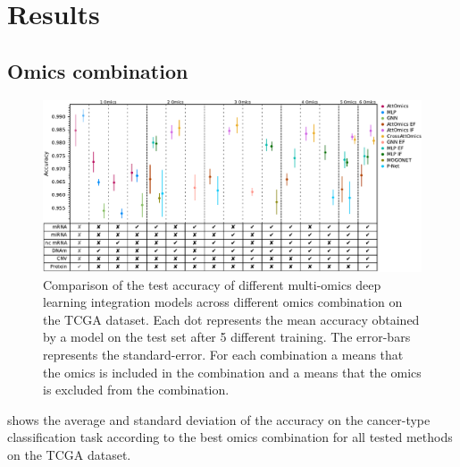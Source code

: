 \documentclass[../main.tex]{subfiles}
\begin{document}
\section{Results}

	\subsection{Omics combination}
		\begin{figure}[htbp]
			\centering
			\includegraphics[width=1\textwidth]{tcga_perf_omics_comb.pdf}
			\caption[Comparison of the test accuracy of different multi-omics deep learning integration models on TCGA data]{Comparison of the test accuracy of different multi-omics deep learning integration models across different omics combination on the TCGA dataset. Each dot represents the mean accuracy obtained by a model on the test set after 5 different training. The error-bars represents the standard-error. For each combination a \cmark means that the omics is included in the combination and a \xmark means that the omics is excluded from the combination.}
			\label{fig:tcga_perf_comb}
		\end{figure}
		 shows the average and standard deviation of the accuracy on the cancer-type classification task according to the best omics combination for all tested methods on the TCGA dataset.
\end{document}
